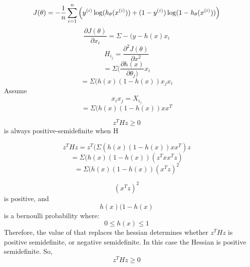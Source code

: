 \begin{answer}

\[J(\theta) = -\frac{1}{{n}} \sum_{i=1}^{n} \left(y^{(i)}\log(h_{\theta}(x^{(i)})) +  (1 - y^{(i)})\log(1 - h_{\theta}(x^{(i)}))\right)\]
\[\frac{\partial J(\theta)}{\partial x_i} = \Sigma-(y - h(x)x_i\]
\[H_i_j =  \frac{\partial^2 J(\theta)}{\partial x^2}\] 
\[=\Sigma(\frac{\partial h(x)}{\partial \theta_j)}x_i  \]
\[=\Sigma (h(x)(1 - h(x)) x_jx_i \]
		Assume
\[x_ix_j = X_i_j \]  
\[=\Sigma (h(x)(1 - h(x)) xx^T\]

\[z^THz \geq 0\]
		is always positive-semidefinite when H 
		
\[z^THz =  z^T(\Sigma (h(x)(1 - h(x)) xx^T)z\]
\[=\Sigma (h(x)(1 - h(x)) (z^Txx^Tz)\]
\[=\Sigma (h(x)(1 - h(x)) (x^Tz)^2\]

\[(x^Tz)^2\]  
 		is positive, and \[h(x)(1 - h(x)\] 
 		is a bernoulli probability 
 where:
\[0 \leq h(x) \leq 1\] 
 Therefore, the value of that replaces the hessian determines whether $z^THz$  is positive semidefinite, or negative semidefinite. In this case the Hessian is positive semidefinite.
So, 
\[z^THz \geq 0\]

\end{answer}


